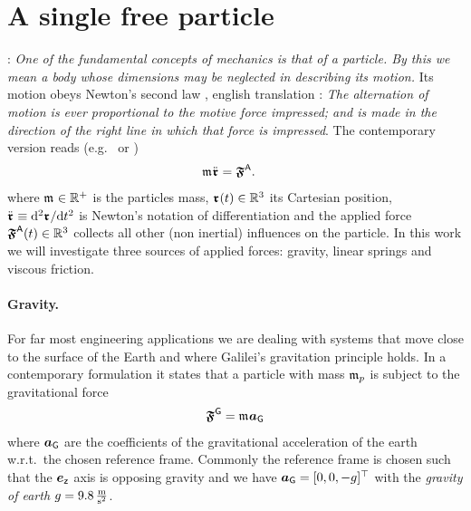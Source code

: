 \section{A single free particle}
\cite[§1]{Landau:Mechanics}: \textit{One of the fundamental concepts of mechanics is that of a \textit{particle}. By this we mean a body whose dimensions may be neglected in describing its motion.}
Its motion obeys Newton's second law \cite[p.\ 13, lex II]{Newton:Principia}, english translation \cite[p.\ 83]{Newton:PrincipiaEnglish}: \textit{The alternation of motion is ever proportional to the motive force impressed; and is made in the direction of the right line in which that force is impressed}. 
The contemporary version reads (e.g.\ \cite[eq.\ 1.3]{Goldstein:ClassicalMechanics} or \cite[eq.\ 6.1.1]{Lurie:AnalyticalMechanics})
\begin{align}\label{eq:NewtonsSecondLaw}
 \mathfrak{m}_{} \ddot{\boldsymbol{\mathfrak{r}}}_{} &= \boldsymbol{\mathfrak{F}}_{}^{\mathsf{A}}.
\end{align}
where $\mathfrak{m}_{}\in \mathbb{R}^+$ is the particles mass, $\boldsymbol{\mathfrak{r}}_{}(t)\in\mathbb{R}^3$ its Cartesian position, $\ddot{\boldsymbol{\mathfrak{r}}}_{} \equiv \mathrm{d}^2 \boldsymbol{\mathfrak{r}}_{} / \mathrm{d} t^2$ is Newton's notation of differentiation and the applied force $\boldsymbol{\mathfrak{F}}_{}^{\mathsf{A}}(t)\in\mathbb{R}^3$ collects all other (non inertial) influences on the particle.
In this work we will investigate three sources of applied forces: gravity, linear springs and viscous friction.

\paragraph{Gravity.}
For far most engineering applications we are dealing with systems that move close to the surface of the Earth and where Galilei's gravitation principle \cite[Day 3]{Galileo:TwoNewSciences} holds.
In a contemporary formulation it states that a particle with mass $\mathfrak{m}_{p}$ is subject to the gravitational force
\begin{align}\label{eq:ParticleGravity}
 \boldsymbol{\mathfrak{F}}_{}^{\mathsf{G}} = \mathfrak{m}_{} \boldsymbol{a}_{\mathsf{G}}
\end{align}
where $\boldsymbol{a}_{\mathsf{G}}$ are the coefficients of the gravitational acceleration of the earth w.r.t.\ the chosen reference frame.
Commonly the reference frame is chosen such that the $\boldsymbol{e}_{\mathsf{z}}$ axis is opposing gravity and we have $\boldsymbol{a}_{\mathsf{G}} = [0,0,-g]^\top$ with the \textit{gravity of earth} $g = 9.8\,\tfrac{\text{m}}{\text{s}^2}$.


